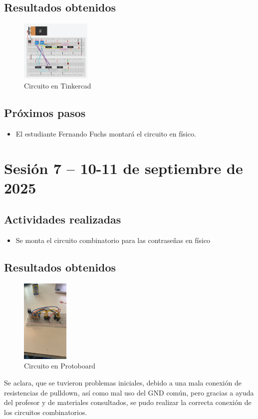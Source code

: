 \documentclass[12pt,letterpaper]{article}
\begin{document}
\subsection*{Resultados obtenidos}
\begin{figure}[H]
    \centering
    \includegraphics[width=0.3\textwidth]{images/tinkercad.png} %
    \caption{Circuito en Tinkercad}
    \label{fig:tinkercad}
\end{figure}

\subsection*{Próximos pasos}
\begin{itemize}
    \item El estudiante Fernando Fuchs montará el circuito en físico.
\end{itemize}


\section{Sesión 7 -- 10-11 de septiembre de 2025}
\subsection*{Actividades realizadas}
\begin{itemize}
    \item Se monta el circuito combinatorio para las contraseñas en físico
\end{itemize}

\subsection*{Resultados obtenidos}
\begin{figure}[H]
    \centering
    \includegraphics[width=0.2\textwidth]{images/fuchs1.jpg} %
    \caption{Circuito en Protoboard}
    \label{fig:tinkercad}
\end{figure}
Se aclara, que se tuvieron problemas iniciales, debido a una mala conexión de resistencias de pulldown, así como mal uso del GND común, pero gracias a ayuda del profesor y de materiales consultados, se pudo realizar la correcta conexión de los circuitos combinatorios.
\end{document}
